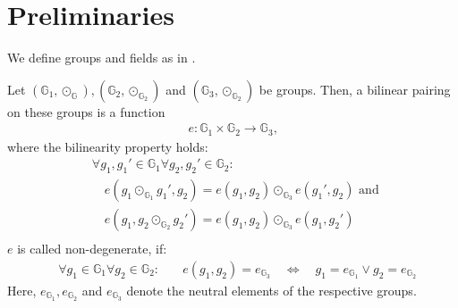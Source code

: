 % 
\chapter{Preliminaries}

We define groups and fields as in \cite{least_authority_moonmath_2024}.

\begin{definition}
    \label{def:bilinearPairing}
    Let $(\mathbb{G}_1, \odot_{\mathbb{G}}), (\mathbb{G}_2, \odot_{\mathbb{G}_2})$ and $(\mathbb{G}_3, \odot_{\mathbb{G}_2})$ be groups.
    Then, a bilinear pairing on these groups is a function 
    \begin{align*}
        e:\mathbb{G}_1\times\mathbb{G}_2\to\mathbb{G}_3\text{,}
    \end{align*}
    where the bilinearity property holds:
    \begin{align*}
        &\forall g_1, g_1'\in\mathbb{G}_1\forall g_2, g_2'\in\mathbb{G}_2: \\
        &\quad e(g_1\odot_{\mathbb{G}_1}g_1', g_2)=e(g_1, g_2)\odot_{\mathbb{G}_3} e(g_1',g_2) \text{ and }\\
        &\quad e(g_1, g_2\odot_{\mathbb{G}_2}g_2')=e(g_1, g_2)\odot_{\mathbb{G}_3} e(g_1,g_2') \\
    \end{align*}
    $e$ is called non-degenerate, if:
    \begin{align*}
        &\forall g_1\in\mathbb{G}_1\forall g_2\in\mathbb{G}_2:
        &\quad e(g_1, g_2)=e_{\mathbb{G}_3}\quad\Leftrightarrow\quad g_1=e_{\mathbb{G}_1} \lor g_2=e_{\mathbb{G}_2}
    \end{align*}
    Here, $e_{\mathbb{G}_1}, e_{\mathbb{G}_2}$ and $e_{\mathbb{G}_3}$ denote the neutral elements of the respective groups.
\end{definition}


